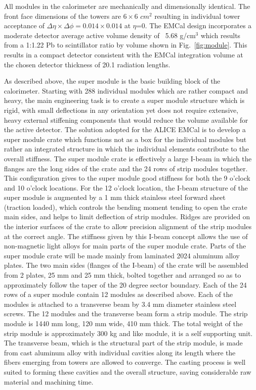 All modules in the calorimeter are mechanically and dimensionally identical. The front face dimensions of the 
towers are $6\times6$ $cm^2$ resulting in individual tower acceptance of $\Delta\eta\times\Delta\phi=0.014\times0.014$ at $\eta$=0.
The EMCal design incorporates a moderate detector average active 
volume density of ~5.68 g/cm$^3$ which results from a 1:1.22 Pb to scintillator ratio by volume shown in Fig.~\ref{fig:module}. 
This results in a compact detector consistent with the EMCal integration volume at the chosen detector thickness of 20.1 radiation lengths. 

As described above, the super module is the basic building block of the calorimeter. 
Starting with 288 individual modules which are rather compact and heavy, the main engineering task is to create a super module structure which is rigid, 
with small deflections in any orientation yet does not require extensive, heavy external stiffening components that would reduce the volume available for the active detector. 
The solution adopted for the ALICE EMCal is to develop a super module crate which functions not as a box for the individual modules 
but rather an integrated structure in which the individual elements contribute to the overall stiffness. 
The super module crate is effectively a large I-beam in which the flanges are the long sides of the crate and the 24 rows of strip modules together. 
This configuration gives to the super module good stiffness for both the 9 o'clock and 10 o'clock locations. For the 12 o'clock location, 
the I-beam structure of the super module is augmented by a 1 mm thick stainless steel forward sheet (traction loaded), 
which controls the bending moment tending to open the crate main sides, and helps to limit deflection of strip modules. 
Ridges are provided on the interior surfaces of the crate to allow precision alignment of the strip modules at the correct angle. 
The stiffness given by this I-beam concept allows the use of non-magnetic light alloys for main parts of the super module crate. 
Parts of the super module crate will be made mainly from laminated 2024 aluminum alloy plates. 
The two main sides (flanges of the I-beam) of the crate will be assembled from 2 plates, 25 mm and 25 mm thick, 
bolted together and arranged so as to approximately follow the taper of the 20 degree sector boundary. Each of the 24 rows of a super module contain 12 modules as described above. 
Each of the modules is attached to a transverse beam by 3.4 mm diameter stainless steel screws. 
The 12 modules and the transverse beam form a strip module. The strip module is 1440 mm long, 120 mm wide, 410 mm thick. 
The total weight of the strip module is approximately 300 kg and like module, it is a self supporting unit. 
The transverse beam, which is the structural part of the strip module, is made from cast aluminum alloy 
with individual cavities along its length where the fibers emerging from towers are allowed to converge. 
The casting process is well suited to forming these cavities and the overall structure, saving considerable raw material and machining time. 

